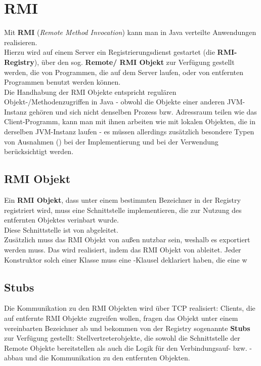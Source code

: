 \section{RMI}

Mit \textbf{RMI} (\textit{Remote Method Invocation}) kann man in Java verteilte Anwendungen realisieren.\\
Hierzu wird auf einem Server ein Registrierungsdienst gestartet (die \textbf{RMI-Registry}), über den sog. \textbf{Remote/ RMI Objekt} zur Verfügung gestellt werden, die von Programmen, die auf dem Server laufen, oder von entfernten Programmen benutzt werden können.\\
Die Handhabung der RMI Objekte entspricht regulären Objekt-/Methodenzugriffen in Java - obwohl die Objekte einer anderen JVM-Instanz gehören und sich nicht denselben Prozess {bzw.} Adressraum teilen wie das Client-Programm, kann man mit ihnen arbeiten wie mit lokalen Objekten, die in derselben JVM-Instanz laufen - es müssen allerdings zusätzlich besondere Typen von Ausnahmen () bei der Implementierung und bei der Verwendung berücksichtigt werden.\\

\subsection*{RMI Objekt}
Ein \textbf{RMI Objekt}, dass unter einem bestimmten Bezeichner in der Registry registriert wird, muss eine Schnittstelle implementieren, die zur Nutzung des entfernten Objektes verinbart wurde.\\
Diese Schnittstelle ist von  abgeleitet.\\
Zusätzlich muss das RMI Objekt von außen nutzbar sein, weshalb es exportiert werden muss.
Das wird realisiert, indem das RMI Objekt von  ableitet.
Jeder Konstruktor solch einer Klasse muss eine -Klausel deklariert haben, die eine  w

\subsection*{Stubs}
Die Kommunikation zu den RMI Objekten wird über TCP realisiert: Clients, die auf entfernte RMI Objekte zugreifen wollen, fragen das Objekt unter einem vereinbarten Bezeichner ab und bekommen von der Registry sogenannte \textbf{Stubs} zur Verfügung gestellt: Stellvertreterobjekte, die sowohl die Schnittstelle der Remote Objekte bereitstellen als auch die Logik für den Verbindungsauf- bzw. -abbau und die Kommunikation zu den entfernten Objekten.\\

